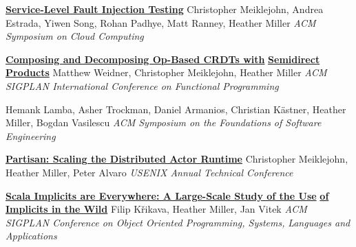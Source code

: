 \documentclass[9pt]{article}
\begin{document}
\noindent\href{https://dl.acm.org/doi/10.1145/3472883.3487005}{\bf Service-Level Fault Injection Testing}
\newline\noindent Christopher Meiklejohn, Andrea Estrada, Yiwen Song, Rohan Padhye, \vspace{-0.03in}
\newline\noindent Matt Ranney, Heather Miller
\newline\noindent\emph{ACM Symposium on Cloud Computing}
\bigskip

\noindent\href{https://arxiv.org/abs/2004.04303}{\bf Composing and Decomposing Op-Based CRDTs with}\vspace{-0.03in}
\newline\noindent\href{https://arxiv.org/abs/2004.04303}{\bf Semidirect Products}
\newline\noindent Matthew Weidner, Christopher Meiklejohn, Heather Miller
\newline\noindent\emph{ACM SIGPLAN International Conference on Functional Programming}
\bigskip

\vspace{-0.03in}
\newline{}
\newline\noindent Hemank Lamba, Asher Trockman, Daniel Armanios, Christian K\"{a}stner, \vspace{-0.03in}
\newline\noindent Heather Miller, Bogdan Vasilescu
\newline\noindent\emph{ACM Symposium on the Foundations of Software Engineering}
\bigskip

\noindent\href{https://www.usenix.org/system/files/atc19-meiklejohn.pdf}{\bf Partisan: Scaling the Distributed Actor Runtime}
\newline\noindent Christopher Meiklejohn, Heather Miller, Peter Alvaro
\newline\noindent\emph{USENIX Annual Technical Conference}
\bigskip

\noindent\href{https://arxiv.org/pdf/1908.07883}{\bf Scala Implicits are Everywhere: A Large-Scale Study of the Use}\vspace{-0.03in}
\newline\noindent\href{https://arxiv.org/pdf/1908.07883}{\bf of Implicits in the Wild}
\newline\noindent Filip K\v{r}ikava, Heather Miller, Jan Vitek
\newline\noindent\emph{ACM SIGPLAN Conference on Object Oriented Programming, Systems,}
\newline\noindent\emph{Languages and Applications}
\bigskip
\end{document}
